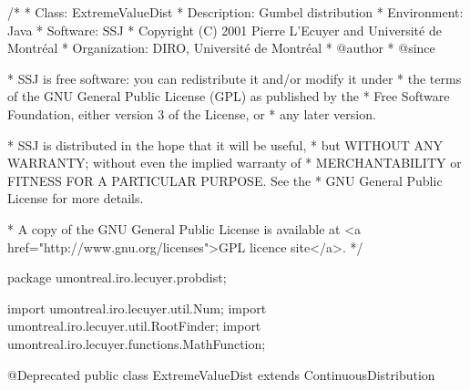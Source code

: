 \begin{code}
\begin{hide}
/*
 * Class:        ExtremeValueDist
 * Description:  Gumbel distribution
 * Environment:  Java
 * Software:     SSJ 
 * Copyright (C) 2001  Pierre L'Ecuyer and Université de Montréal
 * Organization: DIRO, Université de Montréal
 * @author       
 * @since

 * SSJ is free software: you can redistribute it and/or modify it under
 * the terms of the GNU General Public License (GPL) as published by the
 * Free Software Foundation, either version 3 of the License, or
 * any later version.

 * SSJ is distributed in the hope that it will be useful,
 * but WITHOUT ANY WARRANTY; without even the implied warranty of
 * MERCHANTABILITY or FITNESS FOR A PARTICULAR PURPOSE.  See the
 * GNU General Public License for more details.

 * A copy of the GNU General Public License is available at
   <a href="http://www.gnu.org/licenses">GPL licence site</a>.
 */
\end{hide}
package umontreal.iro.lecuyer.probdist;
\begin{hide}
import umontreal.iro.lecuyer.util.Num;
import umontreal.iro.lecuyer.util.RootFinder;
import umontreal.iro.lecuyer.functions.MathFunction;
\end{hide}
@Deprecated
public class ExtremeValueDist extends ContinuousDistribution\begin{hide} {
   private double alpha;
   private double lambda;

   private static class Function implements MathFunction {
      protected int n;
      protected double mean;
      protected double[] x;

      public Function (double[] x, int n, double mean) {
         this.n = n;
         this.mean = mean;
         this.x = new double[n];

         System.arraycopy(x, 0, this.x, 0, n);
      }

      public double evaluate (double lambda) {
         if (lambda <= 0.0) return 1.0e200;
         double exp = 0.0;
         double sumXiExp = 0.0;
         double sumExp = 0.0;

         for (int i = 0; i < n; i++)
         {
            exp = Math.exp (-x[i] * lambda);
            sumExp += exp;
            sumXiExp += x[i] * exp;
         }

         return ((mean - 1.0 / lambda) * sumExp - sumXiExp);
      }
   }
\end{hide}
\end{code}
